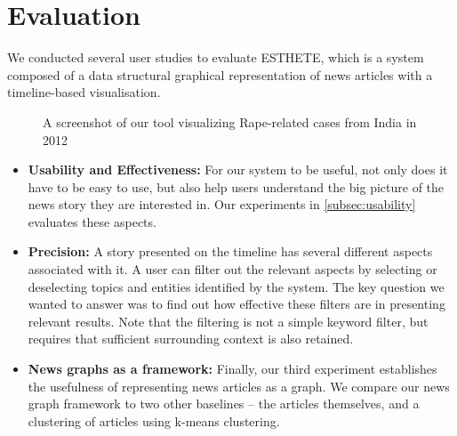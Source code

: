 \section{Evaluation}
\label{sec:eval}

We conducted several user studies to evaluate ESTHETE, which is a system composed of a data structural graphical representation of news articles with a timeline-based visualisation.
\begin{figure}[ht]
\caption{A screenshot of our tool visualizing Rape-related cases from India in 2012}
\label{fig:complete-tool-screenshot}
\end{figure}

\begin{itemize}
	
	\item {\bf Usability and Effectiveness:} For our system to be useful, not only does it have to be easy to use, but also help users understand the big picture of the news story they are interested in. Our experiments in \ref{subsec:usability} evaluates these aspects.
	
	\item {\bf Precision:} A story presented on the timeline has several different aspects associated with it.  A user can filter out the relevant aspects by selecting or deselecting topics and entities identified by the system. The key question we wanted to answer was to find out how effective these filters are in presenting relevant results. Note that the filtering is not a simple keyword filter, but requires that sufficient surrounding context is also retained.
	
	\item {\bf News graphs as a framework:} Finally, our third experiment establishes the usefulness of representing news articles as a graph. We compare our news graph framework to two other baselines -- the articles themselves, and a clustering of articles using k-means clustering.
	
\end{itemize}



